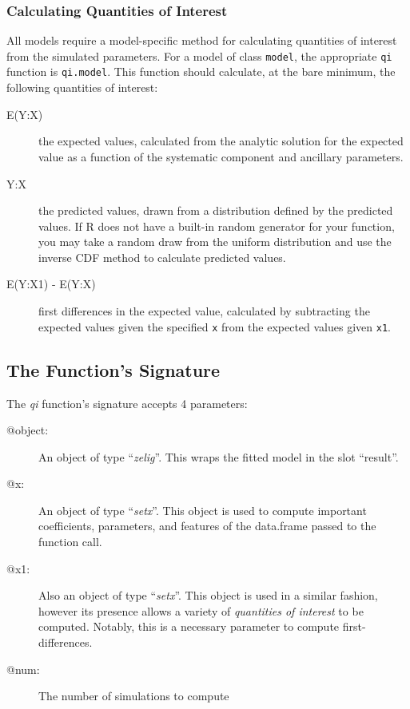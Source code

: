 \subsubsection{Calculating Quantities of Interest}
All models require a model-specific method for calculating quantities of interest from the simulated parameters. For a model of class {\tt model}, the appropriate {\tt qi} function is {\tt qi.model}. This function should calculate, at the bare minimum, the following quantities of interest:

\begin{description}
	\item[E(Y:X)]{the expected values, calculated from the analytic solution for the expected value as a function of the systematic component and ancillary parameters.}
	\item[Y:X]{the predicted values, drawn from a distribution defined by the predicted values. If R does not have a built-in random generator for your function, you may take a random draw from the uniform distribution and use the inverse CDF method to calculate predicted values.}
	\item[E(Y:X1) - E(Y:X)]{first differences in the expected value, calculated by subtracting the expected values given the specified {\tt x} from the expected values given {\tt x1}.}
\end{description}


\subsection{The Function's Signature}


The \emph{qi} function's signature accepts 4 parameters:


%
\begin{description}
	\item[@object:]{An object of type ``\emph{zelig}''.  This wraps the fitted model in the slot ``result''.}
	\item[@x:]{An object of type ``\emph{setx}''.  This object is used to compute important coefficients, parameters, and features of the data.frame passed to the function call.}
	\item[@x1:]{Also an object of type ``\emph{setx}''.  This object is used in a similar fashion, however its presence allows a variety of \emph{quantities of interest} to be computed.  Notably, this is a necessary parameter to compute first-differences.}
	\item[@num:]{The number of simulations to compute}
\end{description}


